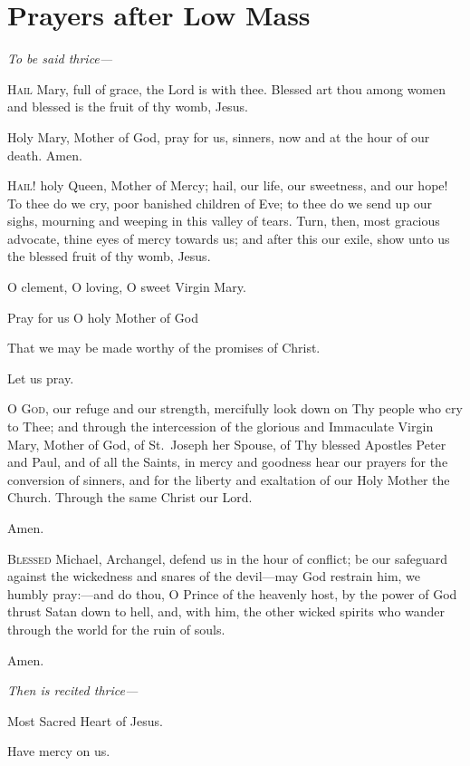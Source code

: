 \section{Prayers after Low Mass}

\label{HailMary}

\kneel
{\emph{To be said thrice---}\par}
\lettrine{H}{ail} Mary, full of grace, the Lord is with thee.  Blessed art thou among women and blessed is the fruit of thy womb, Jesus.

Holy Mary, Mother of God, pray for us, sinners, now and at the hour of our death.  Amen.

\smallskip

\label{HailHolyQueen}
\lettrine{H}{ail!} holy Queen, Mother of Mercy; hail, our life, our
sweetness, and our hope! To thee do we cry, poor
banished children of Eve; to thee do we send up our
sighs, mourning and weeping in this valley of tears. Turn,
then, most gracious advocate, thine eyes of mercy
towards us; and after this our exile, show unto us the
blessed fruit of thy womb, Jesus.

O clement, O loving, O sweet Virgin Mary.

\bigskip

\Vbar Pray for us O holy Mother of God

\Rbar That we may be made worthy of the promises of Christ.

\smallskip

Let us pray.

\lettrine{O}{ God,} our refuge and our strength, mercifully look
down on Thy people who cry to Thee; and through
the intercession of the glorious and Immaculate Virgin
Mary, Mother of God, of St.~Joseph her Spouse, of Thy
blessed Apostles Peter and Paul, and of all the Saints,
in mercy and goodness hear our prayers for the conversion 
of sinners, and for the liberty and exaltation of our
Holy Mother the Church. Through the same Christ our
Lord.

\Rbar Amen.

\smallskip

\lettrine{B}{lessed} Michael, Archangel, defend us in the hour of
conflict; be our safeguard against the wickedness
and snares of the devil---may God restrain him, we
humbly pray:---and do thou, O Prince of the heavenly
host, by the power of God thrust Satan down to hell,
and, with him, the other wicked spirits who wander
through the world for the ruin of souls.

\Rbar Amen.

\smallskip

\textit{Then is recited thrice---}

\Vbar Most Sacred Heart of Jesus.

\Rbar Have mercy on us.


